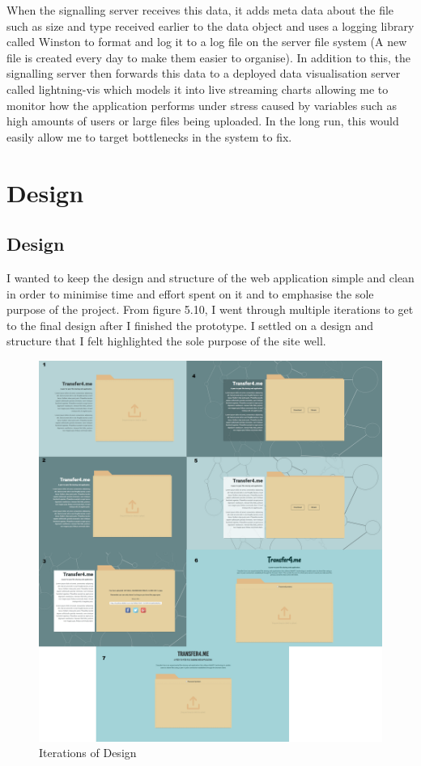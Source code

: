 \documentclass[]{report}
\begin{document}
				When the signalling server receives this data, it adds meta data about the file such as size and type received earlier to the data object and uses a logging library called Winston to format and log it to a log file on the server file system (A new file is created every day to make them easier to organise). In addition to this, the signalling server then forwards this data to a deployed data visualisation server called lightning-vis which models it into live streaming charts allowing me to monitor how the application performs under stress caused by variables such as high amounts of users or large files being uploaded. In the long run, this would easily allow me to target bottlenecks in the system to fix.
				
		\section{Design}			
			\subsection{Design}
			 I wanted to keep the design and structure of the web application simple and clean in order to minimise time and effort spent on it and to emphasise the sole purpose of the project. From figure 5.10, I went through multiple iterations to get to the final design after I finished the prototype. I settled on a design and structure that I felt highlighted the sole purpose of the site well.
	
			\begin{figure}[H]
				\caption{Iterations of Design}
				\centering
				\includegraphics[scale=0.15]{design.png}
			\end{figure}
		
\end{document}

